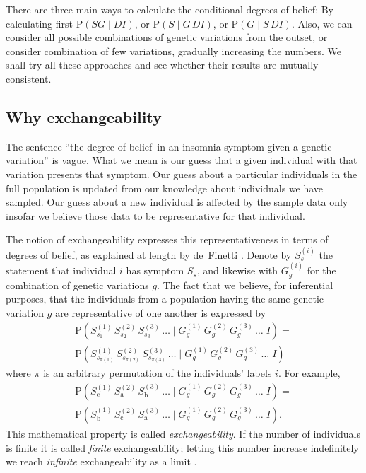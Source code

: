 \documentclass[\ifafour a4paper,12pt,\else a5paper,10pt,\fi%
onecolumn,oneside,article,%
british%
]{memoir}
\theoremstyle{remark}
\theoremstyle{innote}
\newcommand*{\citep}{\parencites}
\newcommand*{\citey}{\parencites*}
\newcommand*{\p}{\mathrm{P}}%
\renewcommand*{\|}{\mathpunct{|}}
\newcommand*{\dob}{degree of belief}
\newcommand*{\dobs}{degrees of belief}
\newcommand*{\yD}{D}
\newcommand*{\yG}{G}
\newcommand*{\yS}{S}
\newcommand*{\yI}{I}
\newcommand*{\yGi}[1]{G^{(#1)}}
\newcommand*{\ySi}[1]{S^{(#1)}}
\begin{document}
There are three main ways to calculate the conditional \dobs: By
calculating first $\p(\yS\yG \|\yD\yI)$, or $\p(\yS \|\yG\,\yD\yI)$, or
$\p(\yG \|\yS\,\yD\yI)$. Also, we can consider all possible combinations of
genetic variations from the outset, or consider combination of few
variations, gradually increasing the numbers. We shall try all these
approaches and see whether their results are mutually consistent.


\subsection{Why exchangeability}
\label{sec:why_exchangeability}



The sentence \enquote{the \dob\ in an insomnia symptom given a genetic
  variation} is vague. What we mean is our guess that a given individual
with that variation presents that symptom. Our guess about a particular
individuals in the full population is updated from our knowledge about
individuals we have sampled. Our guess about a new individual is affected
by the sample data only insofar we believe those data to be representative
for that individual.

The notion of exchangeability expresses this representativeness in
 terms of \dobs, as explained at length by de~Finetti
\citey{definetti1931,definetti1937,definetti1938}. Denote by $\ySi{i}_s$
the statement that individual $i$ has symptom $\yS_s$, and likewise with
$\yGi{i}_g$ for the combination of genetic variations $g$. The fact that we
believe, for inferential purposes, that the individuals from a population
having the same genetic variation $g$ are representative of one another is
expressed by
\begin{multline}
\label{def_exchangeability}
  \p(\ySi{1}_{s_1}\, \ySi{2}_{s_2}\, \ySi{3}_{s_3}\,\dotso \|
  \yGi{1}_{g}\, \yGi{2}_{g}\, \yGi{3}_{g}\,\dotso
  \;\yI)
  ={}\\
  \p(\ySi{1}_{s_{\pi(1)}}\, \ySi{2}_{s_{\pi(2)}}\, \ySi{3}_{s_{\pi(3)}}\,\dotso \|
  \yGi{1}_{g}\, \yGi{2}_{g}\, \yGi{3}_{g}\,\dotso
  \;\yI)
\end{multline}
where $\pi$ is an arbitrary permutation of the individuals' labels $i$. For
example,
\begin{multline}
\label{example_exchangeability}
  \p(\ySi{1}_{\text{c}}\, \ySi{2}_{\text{a}}\, \ySi{3}_{\text{b}}\,\dotso \|
  \yGi{1}_{g}\, \yGi{2}_{g}\, \yGi{3}_{g}\,\dotso
  \;\yI)
  ={}\\
  \p(\ySi{1}_{\text{b}}\, \ySi{2}_{\text{c}}\, \ySi{3}_{\text{a}}\,\dotso \|
  \yGi{1}_{g}\, \yGi{2}_{g}\, \yGi{3}_{g}\,\dotso
  \;\yI).
\end{multline}
This mathematical property is called \emph{exchangeability}.
If the number of individuals is finite it is called \emph{finite}
exchangeability; letting this number increase indefinitely we reach
\emph{infinite} exchangeability as a limit \citep{heathetal1976}.
\end{document}
